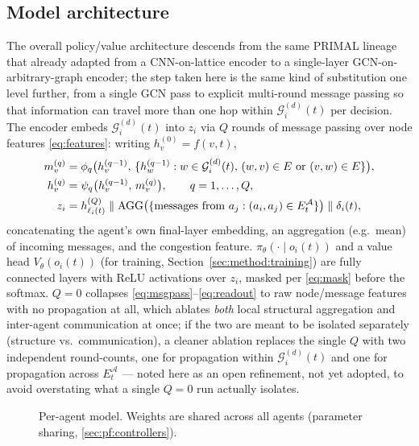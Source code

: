 \documentclass[../main.tex]{subfiles}
\begin{document}
\subsection{Model architecture}
\label{sec:method:model}

The overall policy/value architecture descends from the same PRIMAL lineage
\citep{sartoretti2019primal} that \citet{knippenberg2021} already adapted from
a CNN-on-lattice encoder to a single-layer GCN-on-arbitrary-graph encoder; the
step taken here is the same kind of substitution one level further, from a
single GCN pass to explicit multi-round message passing so that information
can travel more than one hop within $\mathcal{G}_i^{(d)}(t)$ per decision.
The encoder embeds $\mathcal{G}_i^{(d)}(t)$ into $z_i$ via $Q$ rounds of
message passing over node features \eqref{eq:features}: writing
$h_v^{(0)} = f(v,t)$,
\begin{align}
  m_v^{(q)} &= \phi_q\bigl(h_v^{(q-1)},\, \{h_w^{(q-1)} : w \in
               \mathcal{G}_i^{(d)}(t),\, (w,v)\in E \text{ or } (v,w)\in E\}\bigr),
  \label{eq:msgpass} \\
  h_v^{(q)} &= \psi_q\bigl(h_v^{(q-1)},\, m_v^{(q)}\bigr), \qquad q = 1,\dots,Q,
  \notag \\
  z_i &= h_{\ell_i(t)}^{(Q)} \;\Vert\; \mathrm{AGG}\bigl(\{\text{messages
        from } a_j : (a_i,a_j)\in E^{\mathcal{A}}_t\}\bigr) \;\Vert\; \delta_i(t) ,
  \label{eq:readout}
\end{align}
concatenating the agent's own final-layer embedding, an aggregation (e.g.\
mean) of incoming messages, and the congestion feature. $\pi_\theta(\cdot\mid
o_i(t))$ and a value head $V_\theta(o_i(t))$ (for training,
Section~\ref{sec:method:training}) are fully connected layers with ReLU
activations over $z_i$, masked per \eqref{eq:mask} before the softmax.
$Q=0$ collapses \eqref{eq:msgpass}--\eqref{eq:readout} to raw node/message
features with no propagation at all, which ablates \emph{both} local
structural aggregation and inter-agent communication at once; if the two are
meant to be isolated separately (structure vs.\ communication), a cleaner
ablation replaces the single $Q$ with two independent round-counts, one for
propagation within $\mathcal{G}_i^{(d)}(t)$ and one for propagation across
$E^{\mathcal{A}}_t$ --- noted here as an open refinement, not yet adopted, to
avoid overstating what a single $Q=0$ run actually isolates.

\begin{figure}[t]
  \centering
  \caption{Per-agent model. Weights are shared across all agents (parameter
  sharing, \ref{sec:pf:controllers}).}
  \label{fig:architecture}
\end{figure}
\end{document}
